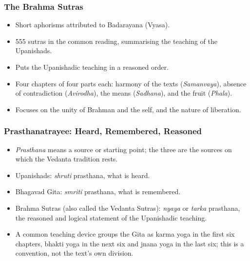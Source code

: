 \begin{frame}[fragile]\frametitle{The Brahma Sutras}

      \begin{itemize}
		\item Short aphorisms attributed to Badarayana (Vyasa).
		\item 555 sutras in the common reading, summarising the teaching of the Upanishads.
		\item Puts the Upanishadic teaching in a reasoned order.
		\item Four chapters of four parts each: harmony of the texts (\textit{Samanvaya}), absence of contradiction (\textit{Avirodha}), the means (\textit{Sadhana}), and the fruit (\textit{Phala}).
		\item Focuses on the unity of Brahman and the self, and the nature of liberation.
	  \end{itemize}

\end{frame}

\begin{frame}[fragile]\frametitle{Prasthanatrayee: Heard, Remembered, Reasoned}

      \begin{itemize}
		\item \textit{Prasthana} means a source or starting point; the three are the sources on which the Vedanta tradition rests.
		\item Upanishads: \textit{shruti} prasthana, what is heard.
		\item Bhagavad Gita: \textit{smriti} prasthana, what is remembered.
		\item Brahma Sutras (also called the Vedanta Sutras): \textit{nyaya} or \textit{tarka} prasthana, the reasoned and logical statement of the Upanishadic teaching.
		\item A common teaching device groups the Gita as karma yoga in the first six chapters, bhakti yoga in the next six and jnana yoga in the last six; this is a convention, not the text's own division.
	  \end{itemize}

\end{frame}

